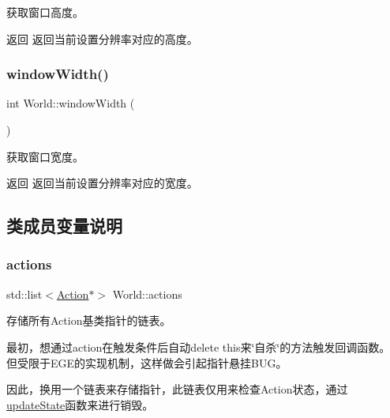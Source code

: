 获取窗口高度。 

\begin{DoxyReturn}{返回}
返回当前设置分辨率对应的高度。 
\end{DoxyReturn}
\mbox{\label{class_world_abaa042832b0d02dd6d9d01a1d03308ee}} 
\subsubsection{\texorpdfstring{window\+Width()}{windowWidth()}}
{\footnotesize\ttfamily int World\+::window\+Width (\begin{DoxyParamCaption}{ }\end{DoxyParamCaption})\hspace{0.3cm}{\ttfamily [inline]}}



获取窗口宽度。 

\begin{DoxyReturn}{返回}
返回当前设置分辨率对应的宽度。 
\end{DoxyReturn}


\subsection{类成员变量说明}
\mbox{\label{class_world_aefe8e0e9e418bbf81671314bf8d019f2}} 
\subsubsection{\texorpdfstring{actions}{actions}}
{\footnotesize\ttfamily std\+::list$<$\hyperlink{class_action}{Action}$\ast$$>$ World\+::actions}



存储所有\+Action基类指针的链表。 

最初，想通过action在触发条件后自动{\ttfamily delete this}来\char`\"{}自杀\char`\"{}的方法触发回调函数。 但受限于\+E\+G\+E的实现机制，这样做会引起指针悬挂\+B\+U\+G。

因此，换用一个链表来存储指针，此链表仅用来检查\+Action状态，通过\hyperlink{class_world_a6a1abe665fc8056caf3dd84663bccfb8}{update\+State}函数来进行销毁。 \mbox{\label{class_world_a932c82c701ec6d13e2857943562954f2}} 
